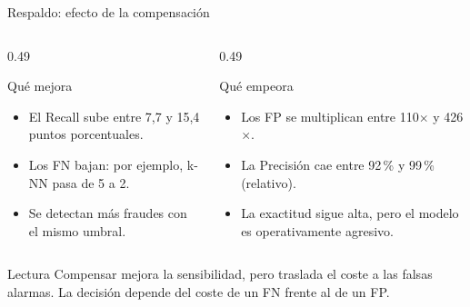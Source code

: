 \documentclass[aspectratio=169,11pt]{beamer}
\begin{document}
\begin{frame}{Respaldo: efecto de la compensación}
  \scriptsize
  \setlength{\tabcolsep}{3pt}
  \renewcommand{\arraystretch}{1.15}
  \vspace{0.15cm}
  \begin{columns}[T]
    \begin{column}{0.49\textwidth}
      \begin{block}{Qué mejora}
        \scriptsize
        \begin{itemize}
          \item El Recall sube entre 7,7 y 15,4 puntos porcentuales.
          \item Los FN bajan: por ejemplo, k-NN pasa de 5 a 2.
          \item Se detectan más fraudes con el mismo umbral.
        \end{itemize}
      \end{block}
    \end{column}
    \begin{column}{0.49\textwidth}
      \begin{block}{Qué empeora}
        \scriptsize
        \begin{itemize}
          \item Los FP se multiplican entre 110\(\times\) y 426\(\times\).
          \item La Precisión cae entre 92\,\% y 99\,\% (relativo).
          \item La exactitud sigue alta, pero el modelo es
                operativamente agresivo.
        \end{itemize}
      \end{block}
    \end{column}
  \end{columns}
  \vspace{0.1cm}
  \begin{alertblock}{Lectura}
    \small
    Compensar mejora la sensibilidad, pero traslada el coste a las
    falsas alarmas. La decisión depende del coste de un FN frente al
    de un FP.
  \end{alertblock}
\end{frame}
\end{document}
